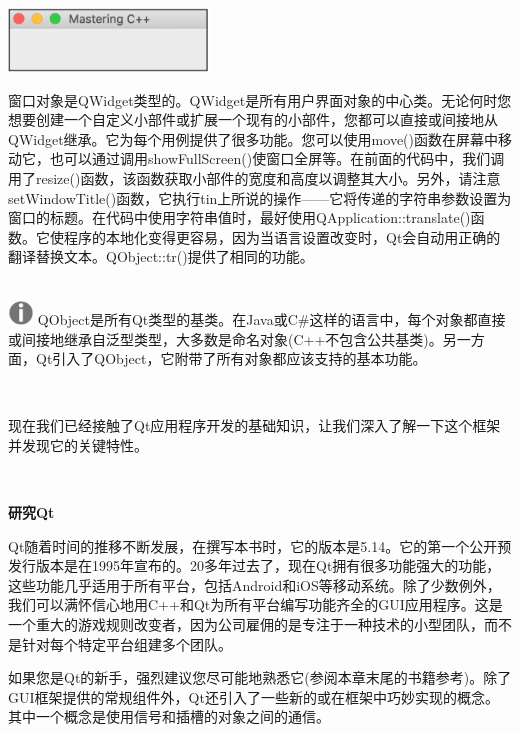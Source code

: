 \begin{center}
	\includegraphics[width=0.4\textwidth]{content/Section-2/Chapter-14/7}
\end{center}

窗口对象是QWidget类型的。QWidget是所有用户界面对象的中心类。无论何时您想要创建一个自定义小部件或扩展一个现有的小部件，您都可以直接或间接地从QWidget继承。它为每个用例提供了很多功能。您可以使用move()函数在屏幕中移动它，也可以通过调用showFullScreen()使窗口全屏等。在前面的代码中，我们调用了resize()函数，该函数获取小部件的宽度和高度以调整其大小。另外，请注意setWindowTitle()函数，它执行tin上所说的操作——它将传递的字符串参数设置为窗口的标题。在代码中使用字符串值时，最好使用QApplication::translate()函数。它使程序的本地化变得更容易，因为当语言设置改变时，Qt会自动用正确的翻译替换文本。QObject::tr()提供了相同的功能。 \par

\hspace*{\fill} \\ %
\includegraphics[width=0.05\textwidth]{images/warn}
QObject是所有Qt类型的基类。在Java或C\#这样的语言中，每个对象都直接或间接地继承自泛型类型，大多数是命名对象(C++不包含公共基类)。另一方面，Qt引入了QObject，它附带了所有对象都应该支持的基本功能。 \par
\noindent\textbf{}\ \par

现在我们已经接触了Qt应用程序开发的基础知识，让我们深入了解一下这个框架并发现它的关键特性。 \par

\noindent\textbf{}\ \par
\textbf{研究Qt} \ \par
Qt随着时间的推移不断发展，在撰写本书时，它的版本是5.14。它的第一个公开预发行版本是在1995年宣布的。20多年过去了，现在Qt拥有很多功能强大的功能，这些功能几乎适用于所有平台，包括Android和iOS等移动系统。除了少数例外，我们可以满怀信心地用C++和Qt为所有平台编写功能齐全的GUI应用程序。这是一个重大的游戏规则改变者，因为公司雇佣的是专注于一种技术的小型团队，而不是针对每个特定平台组建多个团队。 \par
如果您是Qt的新手，强烈建议您尽可能地熟悉它(参阅本章末尾的书籍参考)。除了GUI框架提供的常规组件外，Qt还引入了一些新的或在框架中巧妙实现的概念。其中一个概念是使用信号和插槽的对象之间的通信。 \par

